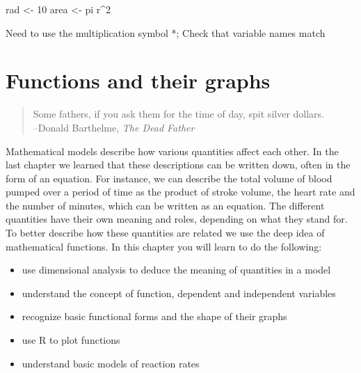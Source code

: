 \documentclass[
  letterpaper,
  DIV=11,
  numbers=noendperiod]{scrreprt}
\newenvironment{Shaded}{\begin{snugshade}}{\end{snugshade}}
\newcommand{\NormalTok}[1]{\textcolor[rgb]{0.00,0.23,0.31}{#1}}
\providecommand{\tightlist}{%
  \setlength{\itemsep}{0pt}\setlength{\parskip}{0pt}}\usepackage{longtable,booktabs,array}
\begin{document}
\begin{Shaded}
\begin{Highlighting}[]
\NormalTok{rad \textless{}{-} 10}
\NormalTok{area \textless{}{-} pi r\^{}2 }
\end{Highlighting}
\end{Shaded}

\begin{tcolorbox}[enhanced jigsaw, arc=.35mm, colframe=quarto-callout-caution-color-frame, left=2mm, opacitybacktitle=0.6, breakable, title=\textcolor{quarto-callout-caution-color}{\faFire}\hspace{0.5em}{Hint}, toprule=.15mm, coltitle=black, bottomtitle=1mm, toptitle=1mm, colback=white, leftrule=.75mm, colbacktitle=quarto-callout-caution-color!10!white, titlerule=0mm, opacityback=0, rightrule=.15mm, bottomrule=.15mm]

Need to use the multiplication symbol *; Check that variable names match

\end{tcolorbox}


\hypertarget{functions-and-their-graphs}{%
\chapter{Functions and their graphs}\label{functions-and-their-graphs}}

\begin{quote}
Some fathers, if you ask them for the time of day, spit silver
dollars.\\
--Donald Barthelme, \emph{The Dead Father}
\end{quote}

Mathematical models describe how various quantities affect each other.
In the last chapter we learned that these descriptions can be written
down, often in the form of an equation. For instance, we can describe
the total volume of blood pumped over a period of time as the product of
stroke volume, the heart rate and the number of minutes, which can be
written as an equation. The different quantities have their own meaning
and roles, depending on what they stand for. To better describe how
these quantities are related we use the deep idea of mathematical
functions. In this chapter you will learn to do the following:

\begin{itemize}
\tightlist
\item
  use dimensional analysis to deduce the meaning of quantities in a
  model
\item
  understand the concept of function, dependent and independent
  variables
\item
  recognize basic functional forms and the shape of their graphs
\item
  use R to plot functions
\item
  understand basic models of reaction rates
\end{itemize}
\end{document}
